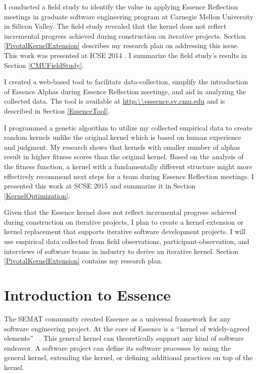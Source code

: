 \documentclass[preprint,12pt,3p]{elsarticle}
\begin{document}
I conducted a field study to identify the value in applying Essence Reflection meetings in graduate software engineering program at Carnegie Mellon University in Silicon Valley. The field study revealed that the kernel does not reflect incremental progress achieved during construction on iterative projects. Section \ref{PivotalKernelExtension} describes my research plan on addressing this issue. This work was presented at ICSE 2014 \cite{ICSE2014}. I summarize the field study's results in Section \ref{CMUFieldStudy}.

I created a web-based tool to facilitate data-collection, simplify the introduction of Essence Alphas during Essence Reflection meetings, and aid in analyzing the collected data. The tool is available at \url{http:\\esssence.sv.cmu.edu} and is described in Section \ref{EssenceTool}.

I programmed a genetic algorithm to utilize my collected empirical data to create random kernels unlike the original kernel which is based on human experience and judgment. My research shows that kernels with smaller number of alphas result in higher fitness scores than the original kernel. Based on the analysis of the fitness function, a kernel with a fundamentally different structure might more effectively recommend next steps for a team during Essence Reflection meetings. I presented this work at SCSE 2015 and summarize it in Section \ref{KernelOptimization}.

Given that the Essence kernel does not reflect incremental progress achieved during construction on iterative projects, I plan to create a kernel extension or kernel replacement that supports iterative software development projects. I will use empirical data collected from field observations, participant-observation, and interviews of software teams in industry to derive an iterative kernel. Section \ref{PivotalKernelExtension} contains my research plan.

\section{Introduction to Essence}
\label{Method}

The SEMAT community created Essence as a universal framework for any software engineering project. At the core of Essence is a ``kernel of widely-agreed elements'' ~\cite{JacobsonQueue}. This general kernel can theoretically support any kind of software endeavor. A software project can define its software processes by using the general kernel, extending the kernel, or defining additional practices on top of the kernel.
\end{document}
